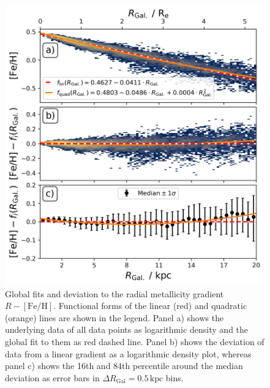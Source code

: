 \documentclass[twocolumn,apj,numberedappendix,appendixfloats]{openjournal}
\begin{document}
\begin{CJK*}{UTF8}{gbsn}
\begin{figure}
    \centering
    \includegraphics[width=\columnwidth]{figures/global_r_feh_fit.png}
    \caption{Global fits and deviation to the radial metallicity gradient $R-\mathrm{[Fe/H]}$. Functional forms of the linear (red) and quadratic (orange) lines are shown in the legend. Panel a) shows the underlying data of all data points as logarithmic density and the global fit to them as red dashed line. Panel b) shows the deviation of data from a linear gradient as a logarithmic density plot, whereas panel c) shows the 16th and 84th percentile around the median deviation as error bars in $\Delta R_\mathrm{Gal} = 0.5\,\mathrm{kpc}$ bins.}
    \label{fig:global_r_feh_fit}
\end{figure}


\end{CJK*}
\end{document}
